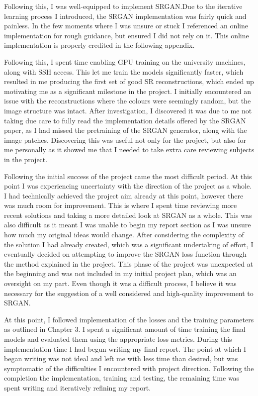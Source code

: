\begin{appendices}
Following this, I was well-equipped to implement SRGAN.\@ Due to the iterative learning process I introduced, the SRGAN implementation was fairly quick and painless. In the few moments where I was unsure or stuck I referenced an online implementation for rough guidance, but ensured I did not rely on it. This online implementation is properly credited in the following appendix.

Following this, I spent time enabling GPU training on the university machines, along with SSH access. This let me train the models significantly faster, which resulted in me producing the first set of good SR reconstructions, which ended up motivating me as a significant milestone in the project. I initially encountered an issue with the reconstructions where the colours were seemingly random, but the image structure was intact. After investigation, I discovered it was due to me not taking due care to fully read the implementation details offered by the SRGAN paper, as I had missed the pretraining of the SRGAN generator, along with the image patches. Discovering this was useful not only for the project, but also for me personally as it showed me that I needed to take extra care reviewing subjects in the project.

Following the initial success of the project came the most difficult period. At this point I was experiencing uncertainty with the direction of the project as a whole. I had technically achieved the project aim already at this point, however there was much room for improvement. This is where I spent time reviewing more recent solutions and taking a more detailed look at SRGAN as a whole. This was also difficult as it meant I was unable to begin my report section as I was unsure how much my original ideas would change. After considering the complexity of the solution I had already created, which was a significant undertaking of effort, I eventually decided on attempting to improve the SRGAN loss function through the method explained in the project. This phase of the project was unexpected at the beginning and was not included in my initial project plan, which was an oversight on my part. Even though it was a difficult process, I believe it was necessary for the suggestion of a well considered and high-quality improvement to SRGAN.\@

At this point, I followed implementation of the losses and the training parameters as outlined in Chapter 3. I spent a significant amount of time training the final models and evaluated them using the appropriate loss metrics. During this implementation time I had begun writing my final report. The point at which I began writing was not ideal and left me with less time than desired, but was symptomatic of the difficulties I encountered with project direction. Following the completion the implementation, training and testing, the remaining time was spent writing and iteratively refining my report.


\end{appendices}
